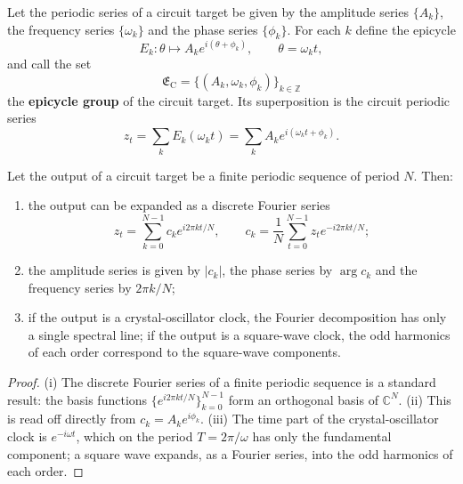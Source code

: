 \begin{definition}\label{def:circuit_epicycle_group}
Let the periodic series of a circuit target be given by the amplitude series $\{A_k\}$, the frequency series $\{\omega_k\}$ and the phase series $\{\phi_k\}$. For each $k$ define the epicycle
\[
E_k:\theta\mapsto A_k e^{i(\theta+\phi_k)},\qquad \theta=\omega_k t,
\]
and call the set
\[
\mathfrak E_{\mathrm{C}}=\{(A_k,\omega_k,\phi_k)\}_{k\in\mathbb Z}
\]
the \textbf{epicycle group} of the circuit target. Its superposition is the circuit periodic series
\[
z_t=\sum_k E_k(\omega_k t)=\sum_k A_k e^{i(\omega_k t+\phi_k)}.
\]
\end{definition}

\begin{theorem}\label{thm:circuit_series_reconstruction}
Let the output of a circuit target be a finite periodic sequence of period $N$. Then:
\begin{enumerate}[label=(\roman*)]
    \item the output can be expanded as a discrete Fourier series
    \[
    z_t=\sum_{k=0}^{N-1}c_k e^{i2\pi kt/N},\qquad
    c_k=\frac1N\sum_{t=0}^{N-1}z_t e^{-i2\pi kt/N};
    \]
    \item the amplitude series is given by $|c_k|$, the phase series by $\arg c_k$ and the frequency series by $2\pi k/N$;
    \item if the output is a crystal-oscillator clock, the Fourier decomposition has only a single spectral line; if the output is a square-wave clock, the odd harmonics of each order correspond to the square-wave components.
\end{enumerate}
\end{theorem}

\begin{proof}
(i) The discrete Fourier series of a finite periodic sequence is a standard result: the basis functions $\{e^{i2\pi kt/N}\}_{k=0}^{N-1}$ form an orthogonal basis of $\mathbb C^N$.
(ii) This is read off directly from $c_k=A_k e^{i\phi_k}$.
(iii) The time part of the crystal-oscillator clock is $e^{-i\omega t}$, which on the period $T=2\pi/\omega$ has only the fundamental component; a square wave expands, as a Fourier series, into the odd harmonics of each order.
\end{proof}

